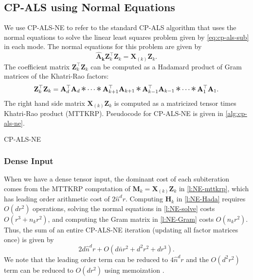 \documentclass{article}
\newcommand{\mat}[1]{\mathbf{#1}}
\DeclareMathOperator*{\hada}{\scalebox{1.5}{$\ast$}}
\begin{document}
\subsection{CP-ALS using Normal Equations}
\label{sec:alg:ne}

We use CP-ALS-NE to refer to the standard CP-ALS algorithm that uses the normal equations to solve the linear least squares problem given by \cref{eq:cp-als-sub} in each mode.
The normal equations for this problem are given by
\begin{equation}
  \label{eq:CP-NE}
  \mat{\hat{A}_k}\mat{Z}_k^\top\mat{Z}_k = \mat{X}_{(k)}\mat{Z}_k.
\end{equation}
The coefficient matrix $\mat{Z}_k^\top\mat{Z}_k$ can be computed as a Hadamard product of Gram matrices of the Khatri-Rao factors:
\begin{equation*}
\mat{Z}_k^\top\mat{Z}_k %
= \mat{A}_d^\top \mat{A}_d \hada \cdots \hada \mat{A}_{k+1}^\top\mat{A}_{k+1} \hada \mat{A}_{k-1}^\top\mat{A}_{k-1} \hada \cdots \hada \mat{A}_{1}^\top\mat{A}_{1}.
\end{equation*}
The right hand side matrix $\mat{X}_{(k)}\mat{Z}_k$ is computed as a matricized tensor times Khatri-Rao product (MTTKRP).
Pseudocode for CP-ALS-NE is given in \cref{alg:cp-als-ne}.

\begin{algorithm}[!ht]
  \caption{CP-ALS-NE}
  \label{alg:cp-als-ne}
  
\end{algorithm}

\subsubsection{Dense Input}

When we have a dense tensor input, the dominant cost of each subiteration comes from the MTTKRP computation of $\mat{M}_k = \mat{X}_{(k)}\mat{Z}_k$ in \cref{l:NE-mttkrp}, which has leading order arithmetic cost of $2\hat n^dr$.
Computing $\mat{H}_k$ in \cref{l:NE-Hada} requires $O(dr^2)$ operations, solving the normal equations in \cref{l:NE-solve} costs $O(r^3+n_kr^2)$, and computing the Gram matrix in \cref{l:NE-Gram} costs $O(n_kr^2)$.
Thus, the sum of an entire CP-ALS-NE iteration (updating all factor matrices once) is given by
\begin{equation*}
2d\hat n^dr + O(d\bar n r^2 + d^2r^2 + dr^3).
\end{equation*}
We note that the leading order term can be reduced to $4\hat n^d r$ and the $O(d^2r^2)$ term can be reduced to $O(dr^2)$ using memoization \cite{phan2013fast}. 
\end{document}
